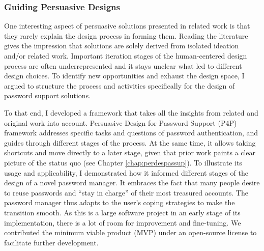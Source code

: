 \subsubsection{Guiding Persuasive Designs}
One interesting aspect of persuasive solutions presented in related work is that they rarely explain the design process in forming them. Reading the literature gives the impression that solutions are solely derived from isolated ideation and/or related work. Important iteration stages of the human-centered design process are often underrepresented and it stays unclear what led to different design choices. To identify new opportunities and exhaust the design space, I argued to structure the process and activities specifically for the design of password support solutions. 


To that end, I developed a framework that takes all the insights from related and original work into account. Persuasive Design for Password Support (P4P) framework addresses specific tasks and questions of password authentication, and guides through different stages of the process. At the same time, it allows taking shortcuts and move directly to a later stage, given that prior work paints a clear picture of the status quo (see Chapter \ref{chap:perdespassup}). To illustrate its usage and applicability, I demonstrated how it informed different stages of the design of a novel password manager. It embraces the fact that many people desire to reuse passwords and ``stay in charge'' of their most treasured accounts. The password manager thus adapts to the user's coping strategies to make the transition smooth. As this is a large software project in an early stage of its implementation, there is a lot of room for improvement and fine-tuning. We contributed the minimum viable product (MVP) under an open-source license to facilitate further development. 


